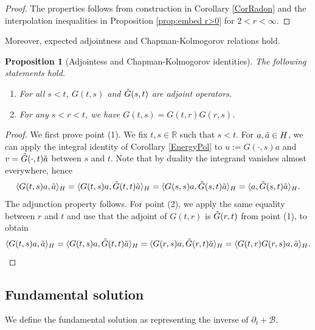 \documentclass[11pt, letterpaper]{amsart}
\newtheorem{prop}[thm]{Proposition}
\theoremstyle{definition}
\theoremstyle{remark}
\numberwithin{equation}{section}
\begin{document}
\begin{proof}
The properties follows from construction in Corollary \ref{CorRadon} and the interpolation inequalities in Proposition \ref{prop:embed r>0} for $2<r<\infty$.
\end{proof}

 Moreover, expected adjointness and Chapman-Kolmogorov relations  hold.
\begin{prop}[Adjointess and Chapman-Kolmogorov identities]\label{Prop Green} The following statements hold.
\begin{enumerate}
    \item For all $s <t $, $G(t,s)$ and $\Tilde{G}(s,t)$ are  adjoint operators.
    \item  For any $s < r <t $, we have $G(t,s)=G(t,r)G(r,s)$.
\end{enumerate}
 
\end{prop}
\begin{proof}
We first prove point (1). We fix $t,s \in \mathbb{R}$ such that $s<t$. For $a,\Tilde{a} \in H$, we can apply the integral identity of Corollary \ref{EnergyPol} to $u:= G(\cdot,s)a$ and $v = \Tilde{G}(\cdot,t)\Tilde{a}$ between $s$ and $t$. Note that by duality the integrand vanishes almost everywhere, hence
\begin{equation*}
 \langle G(t,s)a, \Tilde{a}\rangle_H=    \langle G(t,s)a, \Tilde{G}(t,t)\Tilde{a}\rangle_H =   \langle G(s,s)a, \Tilde{G}(s,t)\Tilde{a}\rangle_H= \langle a, \Tilde{G}(s,t)\Tilde{a}\rangle_H.
    \end{equation*}
    The adjunction property follows. For point (2), we apply the same equality between $r$ and $t$ and use that the adjoint of $G(t,r)$ is $\Tilde{G}(r,t)$ from point (1), to obtain
    \begin{equation*}
 \langle G(t,s)a, \Tilde{a}\rangle_H=    \langle G(t,s)a, \Tilde{G}(t,t)\Tilde{a}\rangle_H =  \langle G(r,s)a, \Tilde{G}(r,t)\Tilde{a}\rangle_H= \langle G(t,r)G(r,s) a, \Tilde{a}\rangle_H.
    \end{equation*}
    
\end{proof}
 


\subsection{Fundamental solution}\label{sec:FS} We define the fundamental solution as representing
the inverse of $\partial_t + \mathcal{B}$.
\end{document}
